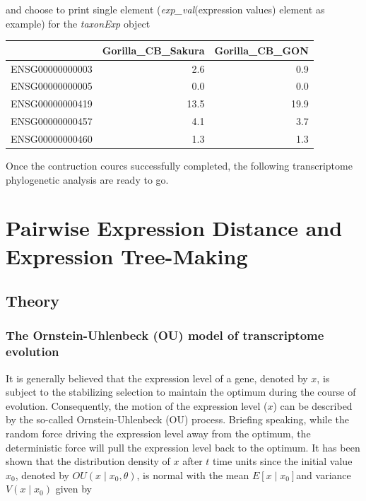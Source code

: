 \documentclass[]{book}
\newenvironment{Shaded}{\begin{snugshade}}{\end{snugshade}}
\newcommand{\DecValTok}[1]{\textcolor[rgb]{0.00,0.00,0.81}{#1}}
\newcommand{\NormalTok}[1]{#1}
\newcommand{\OperatorTok}[1]{\textcolor[rgb]{0.81,0.36,0.00}{\textbf{#1}}}
\begin{document}
and choose to print single element (\emph{exp\_val}(expression values) element as example) for the \emph{taxonExp} object

\begin{Shaded}
\end{Shaded}

\begin{tabular}{l|r|r}
\hline
  & Gorilla\_CB\_Sakura & Gorilla\_CB\_GON\\
\hline
ENSG00000000003 & 2.6 & 0.9\\
\hline
ENSG00000000005 & 0.0 & 0.0\\
\hline
ENSG00000000419 & 13.5 & 19.9\\
\hline
ENSG00000000457 & 4.1 & 3.7\\
\hline
ENSG00000000460 & 1.3 & 1.3\\
\hline
\end{tabular}

Once the contruction courcs successfully completed, the following transcriptome phylogenetic analysis are ready to go.

\hypertarget{pairwise-expression-distance-and-expression-tree-making}{%
\chapter{Pairwise Expression Distance and Expression Tree-Making}\label{pairwise-expression-distance-and-expression-tree-making}}

\hypertarget{theory}{%
\section{Theory}\label{theory}}

\hypertarget{the-ornstein-uhlenbeck-ou-model-of-transcriptome-evolution}{%
\subsection{The Ornstein-Uhlenbeck (OU) model of transcriptome evolution}\label{the-ornstein-uhlenbeck-ou-model-of-transcriptome-evolution}}

It is generally believed that the expression level of a gene, denoted by \(x\), is subject to the stabilizing selection to maintain the optimum during the course of evolution. Consequently, the motion of the expression level (\(x\)) can be described by the so-called Ornstein-Uhlenbeck (OU) process\citep[\citet{bergmann2004}\citet{butler2004}]{hansen1996}. Briefing speaking, while the random force driving the expression level away from the optimum, the deterministic force will pull the expression level back to the optimum. It has been shown that the distribution density of \(x\) after \(t\) time units since the initial value \(x_0\), denoted by \(OU\left(x\mid x_0,\theta\right)\), is normal with the mean \(E\left[x\mid x_0\right]\)and variance \(V\left(x\mid x_0\right)\) given by
\end{document}
